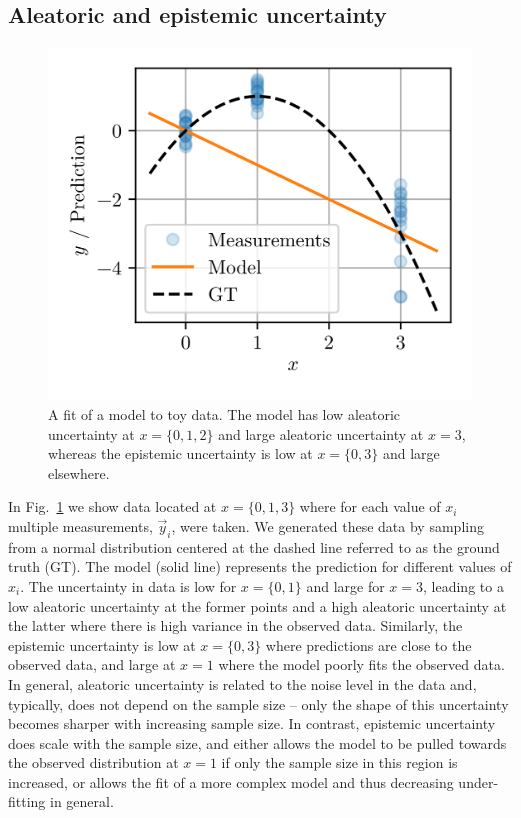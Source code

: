\documentclass{article}
\begin{document}
\subsection{Aleatoric and epistemic uncertainty}
\begin{figure}
    \centering
    \includegraphics[scale=.8]{unctypes.png}
    \caption{A fit of a model to toy data. The model has low aleatoric uncertainty at $x=\{0,1,2\}$ and large aleatoric uncertainty at $x=3$, whereas the epistemic uncertainty is low at $x=\{0,3\}$ and large elsewhere.}
    \label{fig:unctypes}
\end{figure}
In Fig.~\ref{fig:unctypes} we show data located at $x=\{0, 1, 3\}$ where for each value of $x_i$ multiple measurements, $\vec{y}_i$, were taken.
We generated these data by sampling from a normal distribution centered at the dashed line referred to as the ground truth (GT).
The model (solid line) represents the prediction for different values of $x_i$.
The uncertainty in data is low for $x=\{0,1\}$ and large for $x=3$, leading to a low aleatoric uncertainty at the former points and a high aleatoric uncertainty at the latter where there is high variance in the observed data.
Similarly, the epistemic uncertainty is low at $x=\{0,3\}$ where predictions are close to the observed data, and large at $x=1$ where the model poorly fits the observed data.
In general, aleatoric uncertainty is related to the noise level in the data and, typically, does not depend on the sample size -- only the shape of this uncertainty becomes sharper with increasing sample size.
In contrast, epistemic uncertainty does scale with the sample size, and either allows the model to be pulled towards the observed distribution at $x=1$ if only the sample size in this region is increased, or allows the fit of a more complex model and thus decreasing under-fitting in general.
\end{document}
